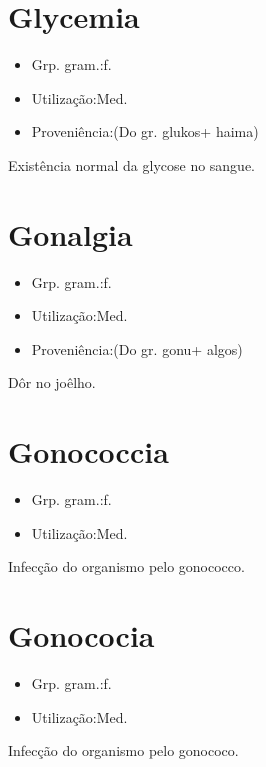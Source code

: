 \section{Glycemia}
\begin{itemize}
\item {Grp. gram.:f.}
\end{itemize}
\begin{itemize}
\item {Utilização:Med.}
\end{itemize}
\begin{itemize}
\item {Proveniência:(Do gr. \textunderscore glukos\textunderscore  + \textunderscore haima\textunderscore )}
\end{itemize}
Existência normal da glycose no sangue.
\section{Gonalgia}
\begin{itemize}
\item {Grp. gram.:f.}
\end{itemize}
\begin{itemize}
\item {Utilização:Med.}
\end{itemize}
\begin{itemize}
\item {Proveniência:(Do gr. \textunderscore gonu\textunderscore  + \textunderscore algos\textunderscore )}
\end{itemize}
Dôr no joêlho.
\section{Gonococcia}
\begin{itemize}
\item {Grp. gram.:f.}
\end{itemize}
\begin{itemize}
\item {Utilização:Med.}
\end{itemize}
Infecção do organismo pelo gonococco.
\section{Gonococia}
\begin{itemize}
\item {Grp. gram.:f.}
\end{itemize}
\begin{itemize}
\item {Utilização:Med.}
\end{itemize}
Infecção do organismo pelo gonococo.
